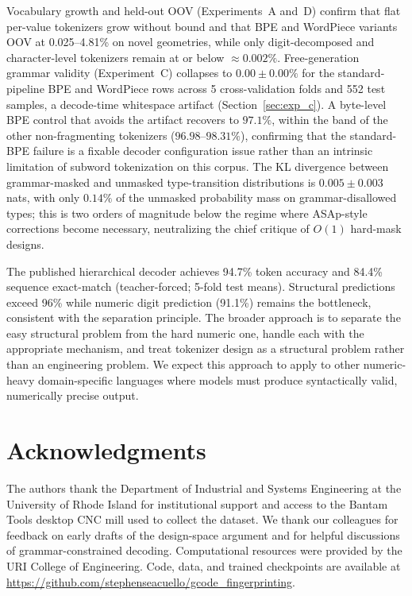 \documentclass[sensors,article,submit,moreauthors,pdftex]{Definitions/mdpi}
\begin{document}
Vocabulary growth and held-out OOV (Experiments~A and~D) confirm that flat per-value tokenizers grow without bound and that BPE and WordPiece variants OOV at 0.025--4.81\% on novel geometries, while only digit-decomposed and character-level tokenizers remain at or below $\approx\!0.002\%$. Free-generation grammar validity (Experiment~C) collapses to $0.00 \pm 0.00\%$ for the standard-pipeline BPE and WordPiece rows across 5 cross-validation folds and 552 test samples, a decode-time whitespace artifact (Section~\ref{sec:exp_c}). A byte-level BPE control that avoids the artifact recovers to $97.1\%$, within the band of the other non-fragmenting tokenizers ($96.98$--$98.31\%$), confirming that the standard-BPE failure is a fixable decoder configuration issue rather than an intrinsic limitation of subword tokenization on this corpus. The KL divergence between grammar-masked and unmasked type-transition distributions is $0.005 \pm 0.003$ nats, with only $0.14\%$ of the unmasked probability mass on grammar-disallowed types; this is two orders of magnitude below the regime where ASAp-style corrections become necessary, neutralizing the chief critique of $O(1)$ hard-mask designs.

The published hierarchical decoder achieves 94.7\% token accuracy and 84.4\% sequence exact-match (teacher-forced; 5-fold test means). Structural predictions exceed 96\% while numeric digit prediction (91.1\%) remains the bottleneck, consistent with the separation principle. The broader approach is to separate the easy structural problem from the hard numeric one, handle each with the appropriate mechanism, and treat tokenizer design as a structural problem rather than an engineering problem. We expect this approach to apply to other numeric-heavy domain-specific languages where models must produce syntactically valid, numerically precise output.

\section*{Acknowledgments}

The authors thank the Department of Industrial and Systems Engineering at the University of Rhode Island for institutional support and access to the Bantam Tools desktop CNC mill used to collect the dataset. We thank our colleagues for feedback on early drafts of the design-space argument and for helpful discussions of grammar-constrained decoding. Computational resources were provided by the URI College of Engineering. Code, data, and trained checkpoints are available at \url{https://github.com/stephenseacuello/gcode\_fingerprinting}.
\end{document}
